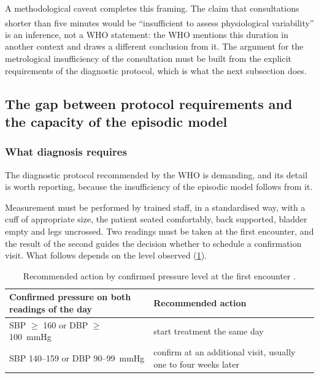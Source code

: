 \documentclass[12pt,a4paper,oneside]{report}
\newcommand{\bq}[1]{``#1''\textsuperscript{\dag}}
\begin{document}
A methodological caveat completes this framing. The claim that consultations shorter than five minutes would be \bq{insufficient to assess physiological variability} is an inference, not a WHO statement: the WHO mentions this duration in another context and draws a different conclusion from it. The argument for the metrological insufficiency of the consultation must be built from the explicit requirements of the diagnostic protocol, which is what the next subsection does.

\subsection{The gap between protocol requirements and the capacity of the episodic model}\label{sec:protocol-gap}

\subsubsection{What diagnosis requires}\label{sec:dx-requires}

The diagnostic protocol recommended by the WHO is demanding, and its detail is worth reporting, because the insufficiency of the episodic model follows from it.

Measurement must be performed by trained staff, in a standardised way, with a cuff of appropriate size, the patient seated comfortably, back supported, bladder empty and legs uncrossed. Two readings must be taken at the first encounter, and the result of the second guides the decision whether to schedule a confirmation visit. What follows depends on the level observed (\cref{tab:protocol}).

\begin{table}[htbp]
\centering\small
\caption{Recommended action by confirmed pressure level at the first encounter \parencite{who2023hypertension}.}\label{tab:protocol}
\begin{tabularx}{\textwidth}{@{}>{\raggedright\arraybackslash}p{6.2cm} X@{}}
\toprule
\textbf{Confirmed pressure on both readings of the day} & \textbf{Recommended action} \\
\midrule
SBP $\geq$ 160 or DBP $\geq$ 100~mmHg & start treatment the same day \\
SBP 140--159 or DBP 90--99~mmHg & confirm at an additional visit, usually one to four weeks later \\
\bottomrule
\end{tabularx}
\end{table}
\end{document}
